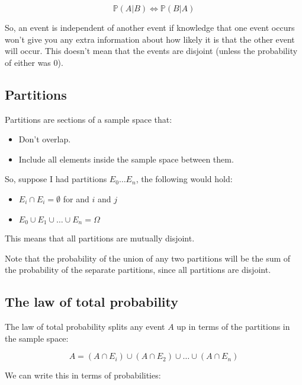 \begin{dmath}
	{\mathbb{P}(A|B) \iff \mathbb{P}(B|A)}
\end{dmath}

So, an event is independent of another event if knowledge that one event occurs
won't give you any extra information about how likely it is that the other event
will occur. This doesn't mean that the events are disjoint (unless the
probability of either was $0$).

\subsection{Partitions}

Partitions are sections of a sample space that:

\begin{itemize}
	\item Don't overlap.
	\item Include all elements inside the sample space between them.
\end{itemize}

So, suppose I had partitions $E_0 \dots E_n$, the following would hold:

\begin{itemize}
	\item $E_i \cap E_i = \emptyset$ for and $i$ and $j$
	\item $E_0 \cup E_1 \cup \dots \cup E_n = \Omega$
\end{itemize}

This means that all partitions are mutually disjoint.


Note that the probability of the union of any two partitions will be the sum of
the probability of the separate partitions, since all partitions are disjoint.

\subsection{The law of total probability}

The law of total probability splits any event $A$ up in terms of the partitions
in the sample space:

\begin{dmath}
	A = (A \cap E_i) \cup (A \cap E_2) \cup \dots \cup (A \cap E_n)
\end{dmath}

We can write this in terms of probabilities:

